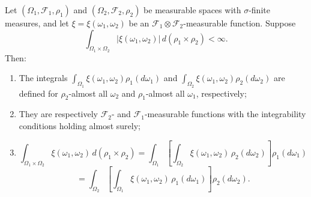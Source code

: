 Let $(\Omega_1, \mathcal{F}_1, \rho_1)$ and $(\Omega_2, \mathcal{F}_2, \rho_2)$ be measurable spaces with $\sigma$-finite measures, and let $\xi = \xi(\omega_1, \omega_2)$ be an $\mathcal{F}_1 \otimes \mathcal{F}_2$-measurable function. Suppose
$$\int_{\Omega_1 \times \Omega_2} |\xi(\omega_1, \omega_2)| \, d(\rho_1 \times \rho_2) < \infty.$$
Then:
\begin{enumerate}
\item[(1)] The integrals $\int_{\Omega_1} \xi(\omega_1, \omega_2) \rho_1(d\omega_1)$ and $\int_{\Omega_2} \xi(\omega_1, \omega_2) \rho_2(d\omega_2)$ are defined for $\rho_2$-almost all $\omega_2$ and $\rho_1$-almost all $\omega_1$, respectively;
\item[(2)] They are respectively $\mathcal{F}_2$- and $\mathcal{F}_1$-measurable functions with the integrability conditions holding almost surely;
\item[(3)] $$\int_{\Omega_1 \times \Omega_2} \xi(\omega_1, \omega_2) \, d(\rho_1 \times \rho_2) = \int_{\Omega_1} \left[ \int_{\Omega_2} \xi(\omega_1, \omega_2) \, \rho_2(d\omega_2) \right] \rho_1(d\omega_1)$$
$$= \int_{\Omega_2} \left[ \int_{\Omega_1} \xi(\omega_1, \omega_2) \, \rho_1(d\omega_1) \right] \rho_2(d\omega_2).$$
\end{enumerate}
